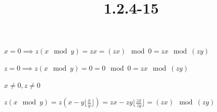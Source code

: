 \documentclass{article}
\title{1.2.4-15}
\begin{document}
\maketitle

\( x = 0 \implies z(x \mod y) = zx = (zx) \mod 0 = zx \mod (zy) \)

\( z = 0 \implies z(x \mod y) = 0 = 0 \mod 0 = zx \mod (zy) \)

\( x \neq 0, z \neq 0 \)

\( z(x \mod y)=z(x-y\lfloor\frac{x}{y}\rfloor) = zx - zy \lfloor\frac{zx}{zy}\rfloor = (zx) \mod (zy) \)
\end{document}
